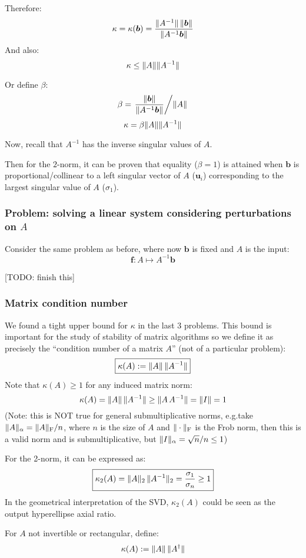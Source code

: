 \documentclass[
  12pt,
  paper=a4,
]{scrartcl} %
\begin{document}
Therefore:
\[
\kappa = \kappa(\bm b) =  \frac{\|A^{-1}\|\,\|\bm b\|}{\|A^{-1}\bm b\|}
\]
And also:
\[\kappa \le \|A\|\|A^{-1}\| \]

Or define $\beta$:
\[\beta =
\left.
    \frac{\|\bm b\|}{\|A^{-1}\bm b\|}
        \middle /
    \|A\|
\right.    
\]
\[\kappa = \beta \|A\|\|A^{-1}\| \]

Now, recall that $A^{-1}$ has the inverse singular values of $A$.

Then for the $2$-norm, it can be proven that equality ($\beta=1$) is attained when $\bm b$ is proportional/collinear to a left singular vector of $A$ ($\bm u_i$) corresponding to the largest singular value of $A$ ($\sigma_1$).

\subsubsection*{Problem: solving a linear system considering perturbations on $A$}

Consider the same problem as before, where now $\bm b$ is fixed and $A$ is the input:
\[
    \bm f : A \mapsto A^{-1}\bm b
\]

[TODO: finish this]

\subsubsection*{Matrix condition number}

We found a tight upper bound for $\kappa$ in the last 3 problems. This bound is important for the study of stability of matrix algorithms so we define it as precisely the ``condition number of a matrix $A$'' (not of a particular problem):
\[
    \boxed{\kappa(A) := \|A\|\,\|A^{-1}\|}
\]
Note that $\kappa(A)\ge 1$ for any induced matrix norm:
\[
    \kappa(A) = \|A\|\,\|A^{-1}\| \ge \|A\, A^{-1}\| = \|I\| = 1
\]
(Note: this is NOT true for general submultiplicative norms, e.g.\@ take $\|A\|_{\alpha} = \|A\|_{\text{F}}/n$, where $n$ is the size of $A$ and $ \|\cdot\|_{\text{F}}$ is the Frob norm, then this is a valid norm and is submultiplicative, but $\|I\|_{\alpha}=\sqrt{n}/n\le 1$)

For the 2-norm, it can be expressed as:
\[
\boxed{
\kappa_2(A)
    = \|A\|_2\,\|A^{-1}\|_2
    = \frac{\sigma_1}{\sigma_n} \ge 1
}
\]
In the geometrical interpretation of the SVD, $\kappa_2(A)$ could be seen as the output hyperellipse axial ratio.

For $A$ not invertible or rectangular, define:
\[\kappa(A) := \|A\|\,\|A^{\dagger}\|\]
\end{document}
